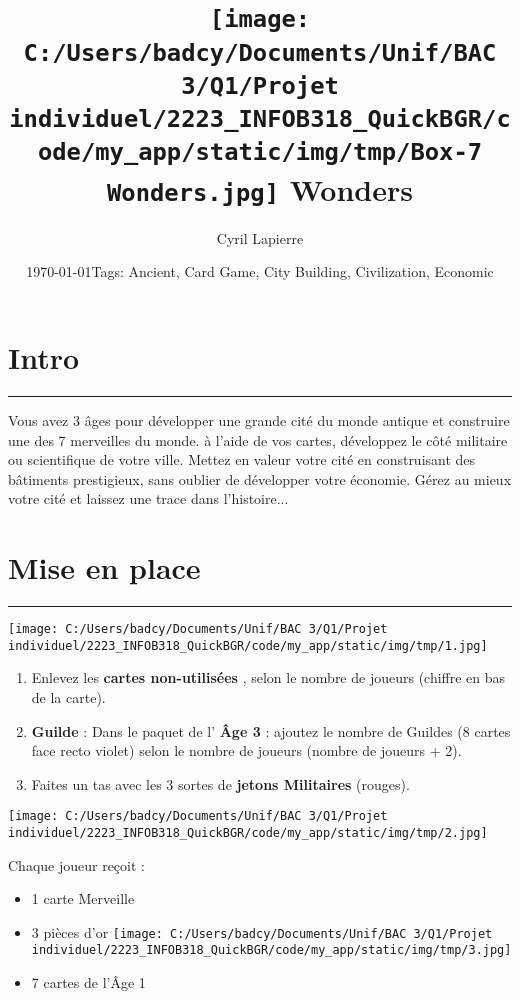 \documentclass{scrartcl}%
\title{\texttt{[image: C:/Users/badcy/Documents/Unif/BAC 3/Q1/Projet individuel/2223\_INFOB318\_QuickBGR/code/my\_app/static/img/tmp/Box-7 Wonders.jpg]}\break 7 Wonders }%
\author{Cyril Lapierre}%
\date{\today \break Tags: Ancient, Card Game, City Building, Civilization, Economic}%
\begin{document}
%
\normalsize%
\maketitle\thispagestyle{header}%
\pagestyle{header}%
\section{ Intro
}%
\label{sec:Intro}%
\rule{18cm}{0.07cm}\break%
Vous avez 3 âges pour développer une grande cité du monde antique et construire une des 7 merveilles du
%
monde. à l’aide de vos cartes, développez le côté militaire ou scientifique de votre ville. Mettez en valeur
%
votre cité en construisant des bâtiments prestigieux, sans oublier de développer votre économie.
%
Gérez au mieux votre cité et laissez une trace dans l'histoire...


%
\section{ Mise en place
}%
\label{sec:Miseenplace}%
\rule{18cm}{0.07cm}\break%
%
\begin{center}\texttt{[image: C:/Users/badcy/Documents/Unif/BAC 3/Q1/Projet individuel/2223\_INFOB318\_QuickBGR/code/my\_app/static/img/tmp/1.jpg]}\end{center}%

%

%
\begin{enumerate}%
\item%
%
 Enlevez les %
\textbf{cartes non{-}utilisées}%
, selon le nombre de joueurs (chiffre en bas de la carte).
%
\item%
%
\textbf{Guilde}%
\textit{ }%
 : Dans le paquet de l'%
\textbf{Âge 3}%
\textit{ }%
 : ajoutez le nombre de Guildes (8 cartes face recto violet) selon le nombre de joueurs (nombre de joueurs + 2).
%
\item%
%
 Faites un tas avec les 3 sortes de %
\textbf{jetons Militaires}%
\textit{ }%
 (rouges).
%
\end{enumerate}%
%
\begin{center}\texttt{[image: C:/Users/badcy/Documents/Unif/BAC 3/Q1/Projet individuel/2223\_INFOB318\_QuickBGR/code/my\_app/static/img/tmp/2.jpg]}\end{center}%

%

%
Chaque joueur reçoit :
%
\begin{itemize}%
\item%
%
 1 carte Merveille
%
\item%
%
 3 pièces d’or %
\texttt{[image: C:/Users/badcy/Documents/Unif/BAC 3/Q1/Projet individuel/2223\_INFOB318\_QuickBGR/code/my\_app/static/img/tmp/3.jpg]}%

%

%
\item%
%
 7 cartes de l'Âge 1 
%
\end{itemize}
\end{document}
